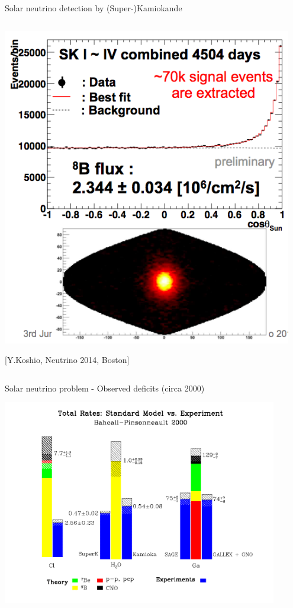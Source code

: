 \begin{frame}[t]{Solar neutrino detection by (Super-)Kamiokande}
\begin{columns}
\begin{column}{0.48\textwidth}
     \includegraphics[width=0.95\textwidth]{./images/3nu/solar/sk_solar_costheta_2014.png}\\
     \begin{center}
       {\scriptsize \color{blue}[Y.Koshio, Neutrino 2014, Boston]\\}
     \end{center}
  \end{column}
\end{columns}
\end{frame}


\begin{frame}[t]{Solar neutrino problem - Observed deficits (circa 2000)}

\begin{center}
  \includegraphics[width=0.90\textwidth]{./images/3nu/solar/colortheoryvsexp2000.png}\\
\end{center}
\end{frame}


